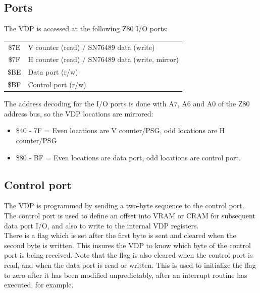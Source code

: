 \documentclass{article}
\begin{document}
\subsection{Ports}

The VDP is accessed at the following Z80 I/O ports:

\begin{table}[H]
    \centering
    \begin{tabular}{c|p{3in}}
        \hline
        \hline
          \$7E & V counter (read) / SN76489 data (write)             \\ 
          \$7F & H counter (read) / SN76489 data (write, mirror)     \\ 
          \$BE & Data port (r/w)                                     \\ 
          \$BF & Control port (r/w)                                  \\
    \end{tabular}
\end{table}

The address decoding for the I/O ports is done with A7, A6 and A0
of the Z80 address bus, so the VDP locations are mirrored:

\begin{itemize}
    \item \$40 - 7F = Even locations are V counter/PSG, odd locations are H counter/PSG
    \item \$80 - BF = Even locations are data port, odd locations are control port.
\end{itemize}


\subsection{Control port}

The VDP is programmed by sending a two-byte sequence to the control port. The
control port is used to define an offset into VRAM or CRAM for subsequent data
port I/O, and also to write to the internal VDP registers.                          
\\

There is a flag which is set after the first byte is sent and cleared when
the second byte is written. This insures the VDP to know which byte of the
control port is being received. Note that the flag is also cleared when the
control port is read, and when the data port is read or written. This is used
to initialize the flag to zero after it has been modified unpredictably, after
an interrupt routine has executed, for example.                                     
\\
\end{document}
